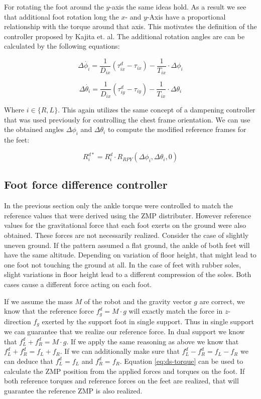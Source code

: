 \documentclass[english,ngerman]{KITreprt}
\begin{document}
For rotating the foot around the $y$-axis the same ideas hold. As a
result we see that additional foot rotation long the $x$- and $y$-Axis
have a proportional relationship with the torque around that axis. This
motivates the definition of the controller proposed by Kajita et. al.
The additional rotation angles are can be calculated by the following
equations:

\begin{equation}
\Delta \dot{\phi_i} = \frac{1}{D_{ix}} (\tau^d_{ix} - \tau_{ix}) - \frac{1}{T_{ix}} \cdot \Delta \phi_i
\end{equation}

\begin{equation}
\Delta \dot{\theta_i} = \frac{1}{D_{ix}} (\tau^d_{iy} - \tau_{iy}) - \frac{1}{T_{ix}} \cdot \Delta \theta_i
\end{equation}

Where $i \in \{R, L\}$. This again utilizes the same concept of a
dampening controller that was used previously for controlling the chest
frame orientation. We can use the obtained angles $\Delta \phi_i$ and
$\Delta \theta_i$ to compute the modified reference frames for the feet:

\begin{equation}
R^{d*}_i = R^d_i \cdot R_{RPY}(\Delta \phi_i, \Delta \theta_i, 0)
\end{equation}

\subsection{Foot force difference
controller}\label{foot-force-difference-controller}

In the previous section only the ankle torque were controlled to match
the reference values that were derived using the ZMP distributer.
However reference values for the gravitational force that each foot
exerts on the ground were also obtained. These forces are not
necessarily realized. Consider the case of slightly uneven ground. If
the pattern assumed a flat ground, the ankle of both feet will have the
same altitude. Depending on variation of floor height, that might lead
to one foot not touching the ground at all. In the case of feet with
rubber soles, slight variations in floor height lead to a different
compression of the soles. Both cases cause a different force acting on
each foot.

If we assume the mass $M$ of the robot and the gravity vector $g$ are
correct, we know that the reference force $f^d_g = M \cdot g$ will
exactly match the force in $z$-direction $f_g$ exerted by the support
foot in single support. Thus in single support we can guarantee that we
realize our reference force. In dual support we know that
$f^d_L + f^d_R = M \cdot g$. If we apply the same reasoning as above we
know that $f^d_L + f^d_R = f_L + f_R$. If we can additionally make sure
that $f^d_L - f^d_R = f_L - f_R$ we can deduce that $f^d_L = f_L$ and
$f^d_R = f_R$. Equation \ref{eq:ds-torque} can be used to calculate the
ZMP position from the applied forces and torques on the foot. If both
reference torques and reference forces on the feet are realized, that
will guarantee the reference ZMP is also realized.
\end{document}
